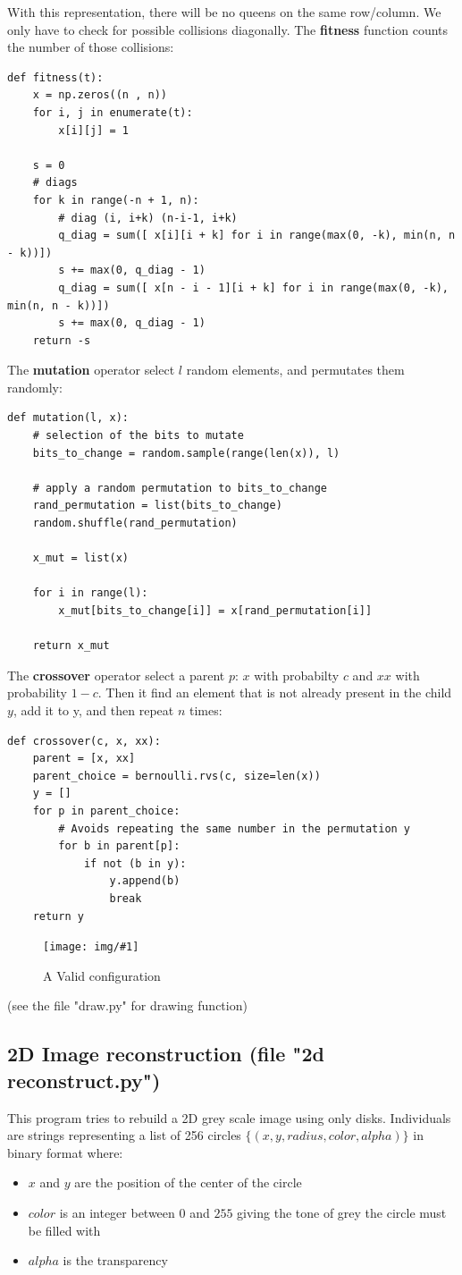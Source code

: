 \documentclass{article}
\newcommand{\IMG}[3]{
\begin{figure}[H]
\centering
\texttt{[image: img/\#1]}%
\caption{#2}%
\label{#1}%
\end{figure}

}
\begin{document}
With this representation, there will be no queens on the same row/column. We only have to check for possible collisions diagonally. The \textbf{fitness} function counts the number of those collisions: 
\begin{verbatim}
def fitness(t): 
	x = np.zeros((n , n))
	for i, j in enumerate(t):
		x[i][j] = 1

	s = 0
	# diags
	for k in range(-n + 1, n):
		# diag (i, i+k) (n-i-1, i+k)
		q_diag = sum([ x[i][i + k] for i in range(max(0, -k), min(n, n - k))])
		s += max(0, q_diag - 1) 
		q_diag = sum([ x[n - i - 1][i + k] for i in range(max(0, -k), min(n, n - k))])
		s += max(0, q_diag - 1)
	return -s 
\end{verbatim}

The \textbf{mutation} operator select $l$ random elements, and permutates them randomly:
\begin{verbatim}
def mutation(l, x):
	# selection of the bits to mutate
	bits_to_change = random.sample(range(len(x)), l)
	
	# apply a random permutation to bits_to_change
	rand_permutation = list(bits_to_change)
	random.shuffle(rand_permutation)

	x_mut = list(x)
	
	for i in range(l):
		x_mut[bits_to_change[i]] = x[rand_permutation[i]]
		
	return x_mut
\end{verbatim}

The \textbf{crossover} operator select a parent $p$: $x$ with probabilty $c$ and $xx$ with probability $1-c$. Then it find an element that is not already present in the child $y$, add it to y, and then repeat $n$ times:
\begin{verbatim}
def crossover(c, x, xx):
	parent = [x, xx]
	parent_choice = bernoulli.rvs(c, size=len(x))
	y = []
	for p in parent_choice:
		# Avoids repeating the same number in the permutation y
		for b in parent[p]:
			if not (b in y):
				y.append(b)
				break
	return y
\end{verbatim}

\IMG{queen.png}{A Valid configuration}{0.4}

(see the file "draw.py" for drawing function)

\subsection{2D Image reconstruction  (file "2d reconstruct.py")}
This program tries to rebuild a 2D grey scale image using only disks. Individuals are strings representing a list of 256 circles $\{ (x, y, radius, color, alpha) \}$ in binary format where:
\begin{itemize}
	\item $x$ and $y$ are the position of the center of the circle
	\item $color$ is an integer between $0$ and $255$ giving the tone of grey the circle must be filled with
	\item $alpha$ is the transparency
\end{itemize}
\end{document}
